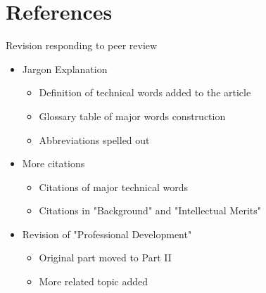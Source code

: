\documentclass{beamer}
\begin{document}
    	\section{References}		\begin{frame}{Revision responding to peer review}
		\begin{itemize}
			\item Jargon Explanation
			\begin{itemize}
				\item Definition of technical words added to the article
				\item Glossary table of major words construction
				\item Abbreviations spelled out 
			\end{itemize}
			\item More citations
			\begin{itemize}
				\item Citations of major technical words
				\item Citations in "Background" and "Intellectual Merits"  
			\end{itemize}
			\item Revision of "Professional Development"
			\begin{itemize}
				\item Original part moved to Part II
				\item More related topic added  
			\end{itemize}
		\end{itemize}
		
	\end{frame}
	
\end{document}
